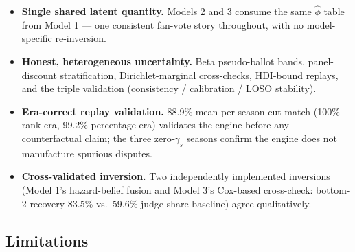 \documentclass[10pt]{article}
\begin{document}
\begin{itemize}[itemsep=1pt]
\item \textbf{Single shared latent quantity.} Models 2 and 3 consume the same
$\hat\phi$ table from Model 1 --- one consistent fan-vote story throughout, with no
model-specific re-inversion.
\item \textbf{Honest, heterogeneous uncertainty.} Beta pseudo-ballot bands,
panel-discount stratification, Dirichlet-marginal cross-checks, HDI-bound replays, and
the triple validation (consistency / calibration / LOSO stability).
\item \textbf{Era-correct replay validation.} 88.9\% mean per-season cut-match (100\% rank
era, 99.2\% percentage era) validates the engine before any counterfactual claim; the
three zero-$\gamma_s$ seasons confirm the engine does not manufacture spurious disputes.
\item \textbf{Cross-validated inversion.} Two independently implemented inversions
(Model 1's hazard-belief fusion and Model 3's Cox-based cross-check: bottom-2 recovery
83.5\% vs.\ 59.6\% judge-share baseline) agree qualitatively.
\end{itemize}

\subsection{Limitations}
\end{document}
